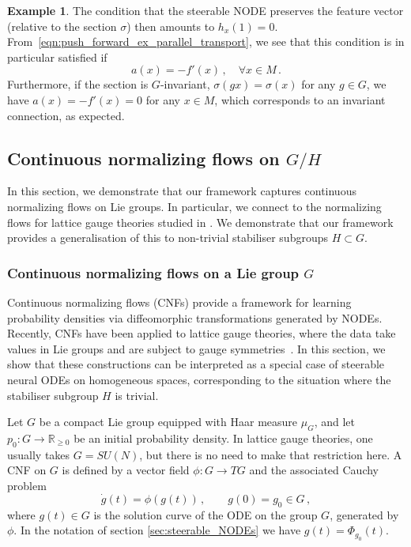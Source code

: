 \documentclass[12pt,a4paper]{article}
\numberwithin{equation}{section}
\theoremstyle{plain}
\theoremstyle{definition}
\newtheorem{example}[theorem]{Example}
\theoremstyle{remark}
\begin{document}
\begin{example}
The condition that the steerable NODE preserves the feature vector (relative to the section $\sigma$) then amounts to $h_x(1) = 0$. From~\eqref{eqn:push_forward_ex_parallel_transport}, we see that this condition is in particular satisfied if
\begin{equation}
    a(x) = -f'(x) \,, \quad \forall x\in M\,.
\end{equation}
Furthermore, if the section is $G$-invariant, $\sigma(gx) = \sigma(x)$ for any $g \in G$, we have $a(x)=-f'(x)=0$ for any $x \in M$, which corresponds to an invariant connection, as expected.
\end{example}

\subsection{Continuous normalizing flows on $G/H$}
In this section, we demonstrate that our framework captures continuous normalizing flows on Lie groups. In particular, we connect to the normalizing flows for lattice gauge theories studied in \cite{Gerdes2024}. We demonstrate that our framework provides a generalisation of this to non-trivial stabiliser subgroups $H\subset G$.

\subsubsection{Continuous normalizing flows on a Lie group $G$}
Continuous normalizing flows (CNFs) provide a framework for learning probability densities via diffeomorphic transformations generated by NODEs. Recently, CNFs have been applied to lattice gauge theories, where the data take values in Lie groups and are subject to gauge symmetries~\cite{Gerdes2024}. In this section, we show that these constructions can be interpreted as a special case of steerable neural ODEs on homogeneous spaces, corresponding to the situation where the stabiliser subgroup $H$ is trivial. 

Let $G$ be a compact Lie group equipped with Haar measure $\mu_G$, and let $p_0 : G \to \mathbb{R}_{\ge 0}$ be an initial probability density. In lattice gauge theories, one usually takes $G=SU(N)$, but there is no need to make that restriction here. A CNF on $G$ is defined by a vector field $\phi : G \to TG$ and the associated Cauchy problem
\begin{equation}\label{eqn:CNF-ODE}
    \dot g(t) = \phi(g(t))\,, \qquad g(0) = g_0 \in G\,, 
\end{equation}
where $g(t)\in G$ is the solution curve of the ODE on the group $G$, generated by $\phi$. In the notation of section \ref{sec:steerable_NODEs} we have $g(t)=\Phi_{g_0}(t)$. 
\end{document}
